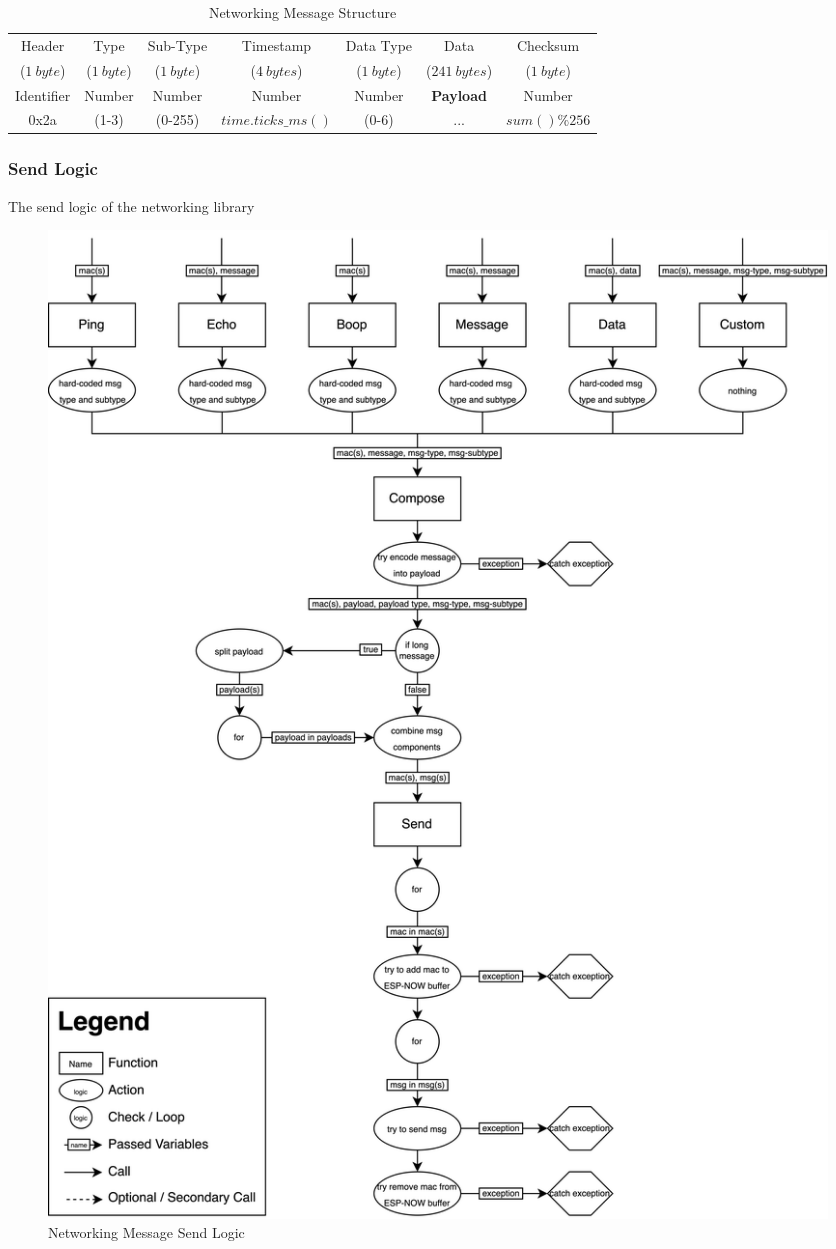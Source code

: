 \begin{table}[H]
    \centering
    \begin{tabular}{|c|c|c|c|c|c|c|}
        \hline
        Header & Type & Sub-Type  & Timestamp & Data Type & Data & Checksum \\
        ($1\ byte$) & ($1\ byte$) & ($1\ byte$) & ($4\ bytes$) & ($1\ byte$) & ($241\ bytes$) & ($1\ byte$) \\
        \hline
        Identifier & Number & Number & Number & Number & \textbf{Payload} & Number \\
        0x2a & (1-3) & (0-255) & $time.ticks\_ms()$ & (0-6) & ... & $sum() \% 256$ \\
        \hline
    \end{tabular}
    \vspace{\ftspace}
    \caption{Networking Message Structure}
    \label{tab:msg_struct}
\end{table}

\subsubsection{\label{sec:methods_send_logic}Send Logic}

The send logic of the networking library

\begin{figure}[H]
    \centering
    \includegraphics[width=\linewidth]{overleaf/images/send_logic.drawio.png}
    \vspace{\ftspace}
    \caption{Networking Message Send Logic}
    \label{fig:net_send_logic}
\end{figure}

